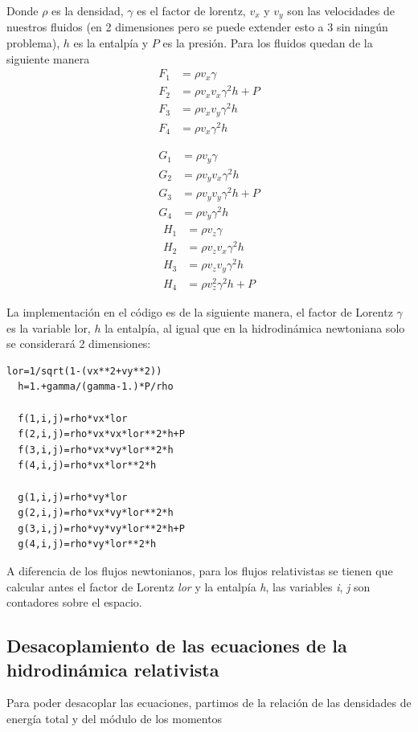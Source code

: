 \documentclass[12pt,a4paper]{book}
\begin{document}
Donde $\rho$ es la densidad, $\gamma$ es el factor de lorentz, $v_{x}$ y $v_{y}$ son las velocidades de nuestros fluidos (en 2 dimensiones pero se puede extender esto a 3 sin ningún problema), $h$ es la entalpía  y $P$ es la presión. Para los fluidos quedan de la siguiente manera
\begin{align}
F_{1}& = \rho v_{x} \gamma \\ 
F_{2}& = \rho v_{x} v_{x} \gamma^{2} h + P\\ 
F_{3}& = \rho v_{x} v_{y} \gamma^{2} h \\ 
F_{4}& = \rho v_{x} \gamma^{2} h 
\end{align}

\begin{align}
G_{1}& = \rho v_{y} \gamma \\ 
G_{2}& = \rho v_{y} v_{x} \gamma^{2} h \\ 
G_{3}& = \rho v_{y} v_{y} \gamma^{2} h + P\\ 
G_{4}& = \rho v_{y} \gamma^{2} h
\end{align}
\begin{align}
H_{1}& = \rho v_{z} \gamma \\ 
H_{2}& = \rho v_{z} v_{x} \gamma^{2} h \\ 
H_{3}& = \rho v_{z} v_{y} \gamma^{2} h \\ 
H_{4}& = \rho v_{z}^{2} \gamma^{2} h + P
\end{align}

La implementación en el código es de la siguiente manera, el factor de Lorentz $\gamma$ es la variable lor, $h$ la entalpía, al igual que en la hidrodinámica
newtoniana solo se considerará 2 dimensiones:

\begin{lstlisting}[frame=single]
  lor=1/sqrt(1-(vx**2+vy**2))
  h=1.+gamma/(gamma-1.)*P/rho
  
  f(1,i,j)=rho*vx*lor
  f(2,i,j)=rho*vx*vx*lor**2*h+P
  f(3,i,j)=rho*vx*vy*lor**2*h
  f(4,i,j)=rho*vx*lor**2*h

  g(1,i,j)=rho*vy*lor
  g(2,i,j)=rho*vx*vy*lor**2*h
  g(3,i,j)=rho*vy*vy*lor**2*h+P
  g(4,i,j)=rho*vy*lor**2*h

\end{lstlisting}

A diferencia de los flujos newtonianos, para los flujos relativistas se tienen que calcular antes el factor de Lorentz \emph{lor} y la entalpía \emph{h},
las variables \emph{i}, \emph{j} son contadores sobre el espacio.

\subsection{Desacoplamiento de las ecuaciones de la hidrodinámica relativista} \label{Cap_Desacoplamiento_de_las_ecuaciones_de_la_hidrodinámica_relativista}
Para poder desacoplar las ecuaciones, partimos de la relación de las densidades de energía total y del módulo de los momentos
\end{document}

